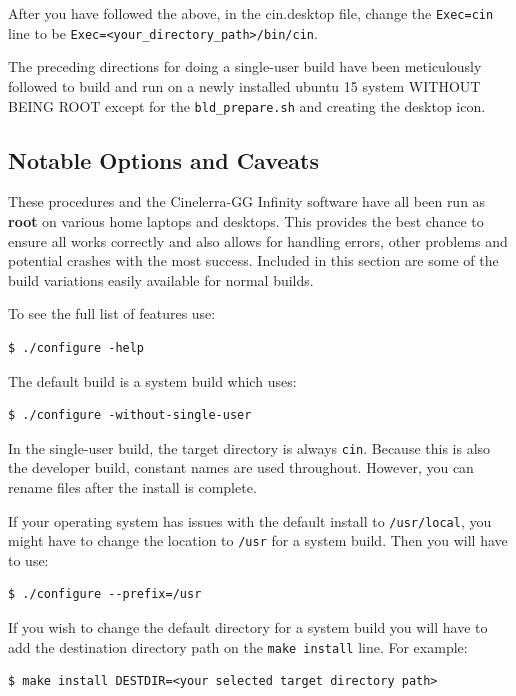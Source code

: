 After you have followed the above, in the cin.desktop file, change the \texttt{Exec=cin} line
to be \texttt{Exec=<your\_directory\_path>/bin/cin}.

The preceding directions for doing a single-user build have been meticulously followed to build and run
on a newly installed ubuntu 15 system WITHOUT BEING ROOT except for the \texttt{bld\_prepare.sh} and creating the desktop icon.

\subsection{Notable Options and Caveats}%
\label{sub:notable_options_and_caveats}

These procedures and the Cinelerra-GG Infinity software have all been run as \textbf{root} on various home laptops and desktops. This provides the best chance to ensure all works correctly and also allows for handling errors, other problems and potential crashes with the most success.  Included in this section are some of the build variations easily available for normal builds.

To see the full list of features use:	 

\begin{lstlisting}[numbers=none]
$ ./configure -help
\end{lstlisting}
The default build is a system build which uses:    

\begin{lstlisting}[numbers=none]
$ ./configure -without-single-user
\end{lstlisting}

In the single-user build, the target directory is always \texttt{cin}.  
Because this is also the developer build, constant names are used throughout.  
However, you can rename files after the install is complete.

If your operating system has issues with the default install to \texttt{/usr/local}, you might have to change the location to \texttt{/usr} for a system build.  Then you will have to use:
\begin{lstlisting}[numbers=none]
$ ./configure --prefix=/usr
\end{lstlisting}

If you wish to change the default directory for a system build you will have to add the destination directory path on the \texttt{make install} line.  For example:
\begin{lstlisting}[numbers=none]
$ make install DESTDIR=<your selected target directory path>
\end{lstlisting}

